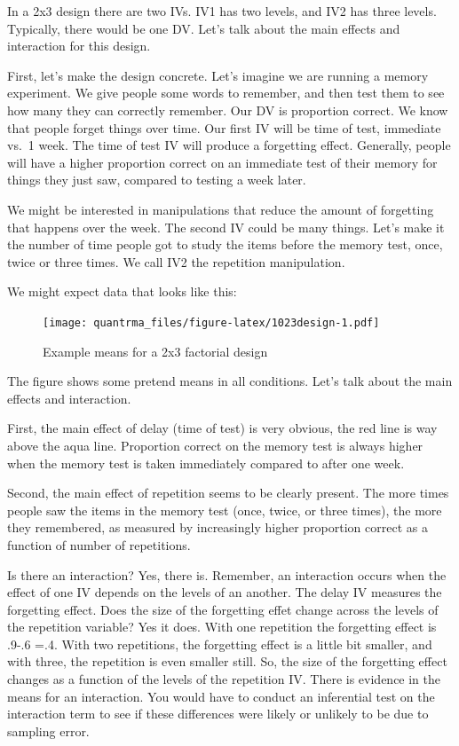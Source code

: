 \documentclass[
]{book}
\begin{document}
In a 2x3 design there are two IVs. IV1 has two levels, and IV2 has three levels. Typically, there would be one DV. Let's talk about the main effects and interaction for this design.

First, let's make the design concrete. Let's imagine we are running a memory experiment. We give people some words to remember, and then test them to see how many they can correctly remember. Our DV is proportion correct. We know that people forget things over time. Our first IV will be time of test, immediate vs.~1 week. The time of test IV will produce a forgetting effect. Generally, people will have a higher proportion correct on an immediate test of their memory for things they just saw, compared to testing a week later.

We might be interested in manipulations that reduce the amount of forgetting that happens over the week. The second IV could be many things. Let's make it the number of time people got to study the items before the memory test, once, twice or three times. We call IV2 the repetition manipulation.

We might expect data that looks like this:

\begin{figure}
\centering
\texttt{[image: quantrma\_files/figure-latex/1023design-1.pdf]}
\caption{\label{fig:1023design}Example means for a 2x3 factorial design}
\end{figure}

The figure shows some pretend means in all conditions. Let's talk about the main effects and interaction.

First, the main effect of delay (time of test) is very obvious, the red line is way above the aqua line. Proportion correct on the memory test is always higher when the memory test is taken immediately compared to after one week.

Second, the main effect of repetition seems to be clearly present. The more times people saw the items in the memory test (once, twice, or three times), the more they remembered, as measured by increasingly higher proportion correct as a function of number of repetitions.

Is there an interaction? Yes, there is. Remember, an interaction occurs when the effect of one IV depends on the levels of an another. The delay IV measures the forgetting effect. Does the size of the forgetting effet change across the levels of the repetition variable? Yes it does. With one repetition the forgetting effect is .9-.6 =.4. With two repetitions, the forgetting effect is a little bit smaller, and with three, the repetition is even smaller still. So, the size of the forgetting effect changes as a function of the levels of the repetition IV. There is evidence in the means for an interaction. You would have to conduct an inferential test on the interaction term to see if these differences were likely or unlikely to be due to sampling error.
\end{document}
